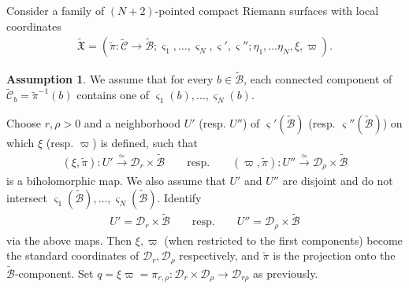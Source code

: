 \documentclass[11pt,b5paper,notitlepage]{article}
\theoremstyle{definition}
\newtheorem{ass}[df]{Assumption}
\theoremstyle{plain}
\newcommand{\fk}{\mathfrak}
\newcommand{\mc}{\mathcal}
\newcommand{\wtd}{\widetilde}
\newcommand{\sgm}{\varsigma}
\numberwithin{equation}{section}
\begin{document}
Consider a family of $(N+2)$-pointed compact Riemann surfaces with local coordinates
\begin{align}
\wtd{\fk X}=(\wtd\pi:\wtd{\mc C}\rightarrow\wtd{\mc B};\sgm_1,\dots,\sgm_N,\sgm',\sgm'';\eta_1,\dots\eta_N,\xi,\varpi).
\end{align}
\begin{ass}\label{lb62}
We assume that for every $b\in\wtd{\mc B}$, each connected component of  $\wtd{\mc C}_b=\wtd\pi^{-1}(b)$ contains one of $\sgm_1(b),\dots,\sgm_N(b)$.
\end{ass}
Choose $r,\rho>0$ and a neighborhood $U'$ (resp. $U''$) of $\sgm'(\wtd {\mc B})$ (resp. $\sgm''(\wtd {\mc B})$) on which $\xi$ (resp. $\varpi$) is defined, such that 
\begin{gather}
(\xi,\wtd\pi):U'\xrightarrow{\simeq} \mc D_{r}\times\wtd{\mc B}\qquad\text{resp.}\qquad (\varpi,\wtd\pi):U''\xrightarrow{\simeq} \mc D_{\rho}\times\wtd{\mc B}\label{eq84}
\end{gather}
is a biholomorphic map. We also assume that $U'$ and $ U''$ are disjoint and do not intersect $\sgm_1(\wtd{\mc B}),\dots,\sgm_N(\wtd{\mc B})$. Identify
\begin{gather*}
U'=\mc D_{r}\times\wtd{\mc B}\qquad\text{resp.}\qquad U''=\mc D_{\rho}\times\wtd{\mc B}
\end{gather*}
via the above maps. Then $\xi,\varpi$ (when restricted to the first components) become the standard coordinates of $\mc D_{r},\mc D_{\rho}$ respectively, and $\wtd\pi$ is the projection onto the $\wtd{\mc B}$-component. Set $q=\xi\varpi=\pi_{r,\rho}:\mc D_{r}\times\mc D_{\rho}\rightarrow\mc D_{r\rho}$ as previously.  
\end{document}
